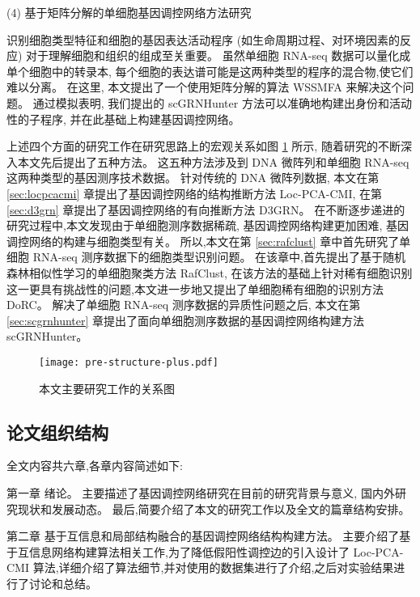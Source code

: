 (4) 基于矩阵分解的单细胞基因调控网络方法研究

识别细胞类型特征和细胞的基因表达活动程序 (如生命周期过程、对环境因素的反应) 对于理解细胞和组织的组成至关重要。
虽然单细胞 RNA-seq 数据可以量化成单个细胞中的转录本,
每个细胞的表达谱可能是这两种类型的程序的混合物,使它们难以分离。
在这里, 本文提出了一个使用矩阵分解的算法 WSSMFA 来解决这个问题。
通过模拟表明, 我们提出的 scGRNHunter 方法可以准确地构建出身份和活动性的子程序, 
并在此基础上构建基因调控网络。

上述四个方面的研究工作在研究思路上的宏观关系如图 \ref{fig:pre-structure} 所示, 随着研究的不断深入本文先后提出了五种方法。
这五种方法涉及到 DNA 微阵列和单细胞 RNA-seq 这两种类型的基因测序技术数据。
针对传统的 DNA 微阵列数据, 本文在第 \ref{sec:locpcacmi} 章提出了基因调控网络的结构推断方法 Loc-PCA-CMI,
在第 \ref{sec:d3grn} 章提出了基因调控网络的有向推断方法 D3GRN。
在不断逐步递进的研究过程中,本文发现由于单细胞测序数据稀疏, 基因调控网络构建更加困难, 基因调控网络的构建与细胞类型有关。
所以,本文在第 \ref{sec:rafclust} 章中首先研究了单细胞 RNA-seq 测序数据下的细胞类型识别问题。
在该章中,首先提出了基于随机森林相似性学习的单细胞聚类方法 RafClust, 
在该方法的基础上针对稀有细胞识别这一更具有挑战性的问题,本文进一步地又提出了单细胞稀有细胞的识别方法 DoRC。
解决了单细胞 RNA-seq 测序数据的异质性问题之后, 本文在第 \ref{sec:scgrnhunter} 章提出了面向单细胞测序数据的基因调控网络构建方法 scGRNHunter。

\begin{figure}[!htbp]
    \centering
    \texttt{[image: pre-structure-plus.pdf]}
    \caption{本文主要研究工作的关系图}
    \label{fig:pre-structure}
\end{figure}

\subsection{论文组织结构}

全文内容共六章,各章内容简述如下:

第一章 绪论。
主要描述了基因调控网络研究在目前的研究背景与意义, 国内外研究现状和发展动态。
最后,简要介绍了本文的研究工作以及全文的篇章结构安排。

第二章 基于互信息和局部结构融合的基因调控网络结构构建方法。
主要介绍了基于互信息网络构建算法相关工作,为了降低假阳性调控边的引入设计了 Loc-PCA-CMI 算法,详细介绍了算法细节,并对使用的数据集进行了介绍,之后对实验结果进行了讨论和总结。


